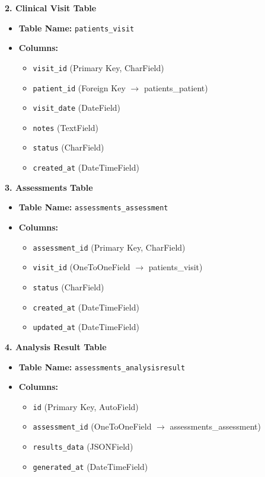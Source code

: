 \documentclass{fisatprojectfinal}
\begin{document}
\textbf{2. Clinical Visit Table}
\begin{itemize}
    \item \textbf{Table Name:} \texttt{patients\_visit}
    \item \textbf{Columns:}
    \begin{itemize}
        \item \texttt{visit\_id} (Primary Key, CharField)
        \item \texttt{patient\_id} (Foreign Key $\rightarrow$ patients\_patient)
        \item \texttt{visit\_date} (DateField)
        \item \texttt{notes} (TextField)
        \item \texttt{status} (CharField)
        \item \texttt{created\_at} (DateTimeField)
    \end{itemize}
\end{itemize}

\textbf{3. Assessments Table}
\begin{itemize}
    \item \textbf{Table Name:} \texttt{assessments\_assessment}
    \item \textbf{Columns:}
    \begin{itemize}
        \item \texttt{assessment\_id} (Primary Key, CharField)
        \item \texttt{visit\_id} (OneToOneField $\rightarrow$ patients\_visit)
        \item \texttt{status} (CharField)
        \item \texttt{created\_at} (DateTimeField)
        \item \texttt{updated\_at} (DateTimeField)
    \end{itemize}
\end{itemize}

\textbf{4. Analysis Result Table}
\begin{itemize}
    \item \textbf{Table Name:} \texttt{assessments\_analysisresult}
    \item \textbf{Columns:}
    \begin{itemize}
        \item \texttt{id} (Primary Key, AutoField)
        \item \texttt{assessment\_id} (OneToOneField $\rightarrow$ assessments\_assessment)
        \item \texttt{results\_data} (JSONField)
        \item \texttt{generated\_at} (DateTimeField)
    \end{itemize}
\end{itemize}
\end{document}
